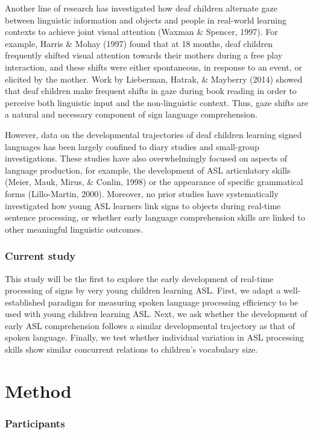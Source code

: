 \documentclass[12pt,]{article}
\begin{document}
Another line of research has investigated how deaf children alternate
gaze between linguistic information and objects and people in real-world
learning contexts to achieve joint visual attention (Waxman \& Spencer,
1997). For example, Harris \& Mohay (1997) found that at 18 months, deaf
children frequently shifted visual attention towards their mothers
during a free play interaction, and these shifts were either
spontaneous, in response to an event, or elicited by the mother. Work by
Lieberman, Hatrak, \& Mayberry (2014) showed that deaf children make
frequent shifts in gaze during book reading in order to perceive both
linguistic input and the non-linguistic context. Thus, gaze shifts are a
natural and necessary component of sign language comprehension.

However, data on the developmental trajectories of deaf children
learning signed languages has been largely confined to diary studies and
small-group investigations. These studies have also overwhelmingly
focused on aspects of language production, for example, the development
of ASL articulatory skills (Meier, Mauk, Mirus, \& Conlin, 1998) or the
appearance of specific grammatical forms (Lillo-Martin, 2000). Moreover,
no prior studies have systematically investigated how young ASL learners
link signs to objects during real-time sentence processing, or whether
early language comprehension skills are linked to other meaningful
linguistic outcomes.

\subsubsection{Current study}\label{current-study}

This study will be the first to explore the early development of
real-time processing of signs by very young children learning ASL.
First, we adapt a well-established paradigm for measuring spoken
language processing efficiency to be used with young children learning
ASL. Next, we ask whether the development of early ASL comprehension
follows a similar developmental trajectory as that of spoken language.
Finally, we test whether individual variation in ASL processing skills
show similar concurrent relations to children's vocabulary size.

\section{Method}\label{method}

\subsubsection{Participants}\label{participants}
\end{document}
